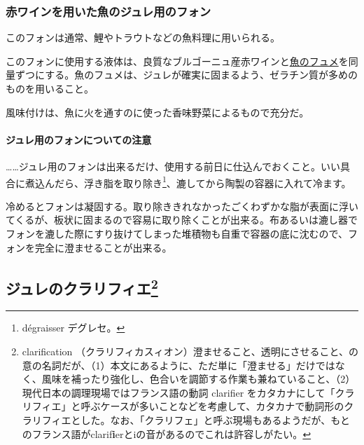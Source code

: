 \begin{recette}
\hypertarget{fonds-pour-gelee-de-poisson-au-vin-rouge}{%
\subsubsection{赤ワインを用いた魚のジュレ用のフォン}\label{fonds-pour-gelee-de-poisson-au-vin-rouge}}



このフォンは通常、鯉やトラウトなどの魚料理に用いられる。

このフォンに使用する液体は、良質なブルゴーニュ産赤ワインと\protect\hyperlink{fumet-de-poisson}{魚のフュメ}を同量ずつにする。魚のフュメは、ジュレが確実に固まるよう、ゼラチン質が多めのものを用いること。

風味付けは、魚に火を通すのに使った香味野菜によるもので充分だ。

\hypertarget{observation-sur-l-emplois-des-fonds-destines-aux-gelees}{%
\paragraph{ジュレ用のフォンについての注意}\label{observation-sur-l-emplois-des-fonds-destines-aux-gelees}}

\ldots{}\ldots{}ジュレ用のフォンは出来るだけ、使用する前日に仕込んでおくこと。いい具合に煮込んだら、浮き脂を取り除き\footnote{dégraisser
  デグレセ。}、漉してから陶製の容器に入れて冷ます。

冷めるとフォンは凝固する。取り除ききれなかったごくわずかな脂が表面に浮いてくるが、板状に固まるので容易に取り除くことが出来る。布あるいは漉し器でフォンを漉した際にすり抜けてしまった堆積物も自重で容器の底に沈むので、フォンを完全に澄ませることが出来る。
\end{recette}
\newpage

\hypertarget{clariication-des-gelees}{%
\subsection[ジュレのクラリフィエ]{\texorpdfstring{ジュレのクラリフィエ\footnote{clarification
  （クラリフィカスィオン）澄ませること、透明にさせること、の意の名詞だが、（1）本文にあるように、ただ単に「澄ませる」だけではなく、風味を補ったり強化し、色合いを調節する作業も兼ねていること、（2）現代日本の調理現場ではフランス語の動詞
  clarifier
  をカタカナにして「クラリフィエ」と呼ぶケースが多いことなどを考慮して、カタカナで動詞形のクラリフィエとした。なお、「クラリフェ」と呼ぶ現場もあるようだが、もとのフランス語がclarif\textbf{i}erとiの音があるのでこれは許容しがたい。}}{ジュレのクラリフィエ}}\label{clariication-des-gelees}}

